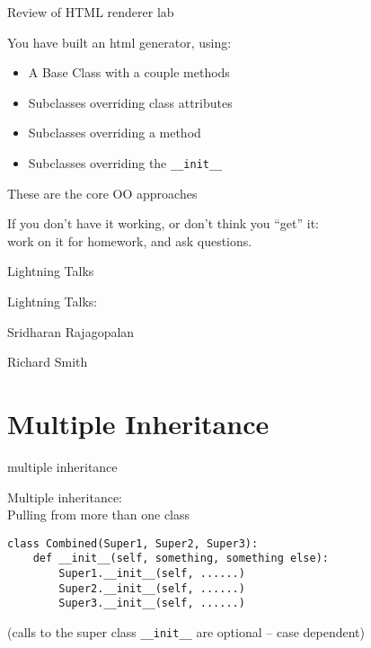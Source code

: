 \documentclass{beamer}
\begin{document}
\begin{frame}[fragile]{Review of HTML renderer lab}

{\Large You have built an html generator, using:} 
  \begin{itemize}
    \item A Base Class with a couple methods
    \item Subclasses overriding class attributes
    \item Subclasses overriding a method
    \item Subclasses overriding the \verb|__init__|
  \end{itemize}

\vfill
{\Large These are the core OO approaches}

\vfill
{\Large If you don't have it working, or don't think you ``get'' it:\\
 work on it for homework, and ask questions.}

\end{frame}


\begin{frame}{Lightning Talks}

{\LARGE Lightning Talks:}

\vfill
{\large Sridharan Rajagopalan}

\vfill
{\large Richard Smith}

\end{frame}

\section{Multiple Inheritance}

\begin{frame}[fragile]{multiple inheritance}

{\Large Multiple inheritance:\\
\hspace{0.2in} Pulling from more than one class}

\vfill
\begin{verbatim}
class Combined(Super1, Super2, Super3):
    def __init__(self, something, something else):
        Super1.__init__(self, ......)        
        Super2.__init__(self, ......)        
        Super3.__init__(self, ......)        
\end{verbatim}
(calls to the super class \verb|__init__| are optional -- case dependent)

\end{frame} 
\end{document}
